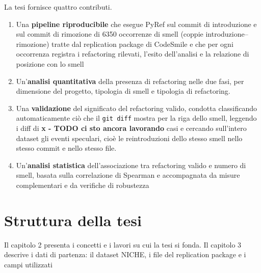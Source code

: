 La tesi fornisce quattro contributi.

\begin{enumerate}
    \item Una \textbf{pipeline riproducibile} che esegue PyRef sul commit di introduzione e sul commit di rimozione di 6350 occorrenze di smell (coppie introduzione–rimozione) tratte dal replication package di CodeSmile e che per ogni occorrenza registra i refactoring rilevati, l'esito dell'analisi e la relazione di posizione con lo smell
    \item Un'\textbf{analisi quantitativa} della presenza di refactoring nelle due fasi, per dimensione del progetto, tipologia di smell e tipologia di refactoring.
    \item Una \textbf{validazione} del significato del refactoring valido, condotta classificando automaticamente ciò che il \texttt{git diff} mostra per la riga dello smell, leggendo i diff di \textbf{x - TODO ci sto ancora lavorando}  casi e cercando sull'intero dataset gli eventi speculari, cioè le reintroduzioni dello stesso smell nello stesso commit e nello stesso file.
    \item Un'\textbf{analisi statistica} dell'associazione tra refactoring valido e numero di smell, basata sulla correlazione di Spearman e accompagnata da misure complementari e da verifiche di robustezza %
\end{enumerate}

\section{Struttura della tesi}

Il capitolo 2 presenta i concetti e i lavori su cui la tesi si fonda. Il capitolo 3 descrive i dati di partenza: il dataset NICHE, i file del replication package e i campi utilizzati 

